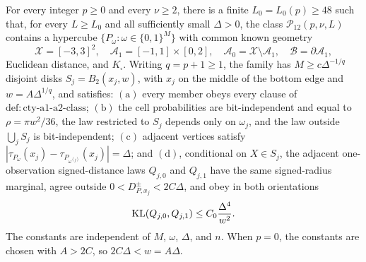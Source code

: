 For every integer \(p\geq0\) and every \(\nu\geq2\), there is a finite \(L_0=L_0(p)\geq48\) such that, for every \(L\geq L_0\) and all sufficiently small \(\Delta>0\), the class \(\mathcal P_{12}(p,\nu,L)\) contains a hypercube \(\{P_\omega:\omega\in\{0,1\}^M\}\) with common known geometry
\[
 \mathcal X=[-3,3]^2,
 \quad \mathcal A_1=[-1,1]\times[0,2],
 \quad \mathcal A_0=\mathcal X\setminus\mathcal A_1,
 \quad \mathcal B=\partial\mathcal A_1,
\]
Euclidean distance, and \(K_\square\).  Writing \(q=p+1\geq1\), the family has \(M\geq c\Delta^{-1/q}\) disjoint disks \(S_j=B_2(x_j,w)\), with \(x_j\) on the middle of the bottom edge and \(w=A\Delta^{1/q}\), and satisfies: \(\mathrm{(a)}\) every member obeys every clause of \(\mathrm{def:cty\text{-}a1\text{-}a2\text{-}class}\); \(\mathrm{(b)}\) the cell probabilities are bit-independent and equal to \(\rho=\pi w^2/36\), the law restricted to \(S_j\) depends only on \(\omega_j\), and the law outside \(\bigcup_jS_j\) is bit-independent; \(\mathrm{(c)}\) adjacent vertices satisfy \(|\tau_{P_\omega}(x_j)-\tau_{P_{\omega^{(j)}}}(x_j)|=\Delta\); and \(\mathrm{(d)}\), conditional on \(X\in S_j\), the adjacent one-observation signed-distance laws \(Q_{j,0}\) and \(Q_{j,1}\) have the same signed-radius marginal, agree outside \(0<D^{\pm}_{P,x_j}<2C\Delta\), and obey in both orientations
\[
 \operatorname{KL}(Q_{j,0},Q_{j,1})\leq C_0{\Delta^4\over w^2}.
\]
The constants are independent of \(M\), \(\omega\), \(\Delta\), and \(n\).  When \(p=0\), the constants are chosen with \(A>2C\), so \(2C\Delta<w=A\Delta\).